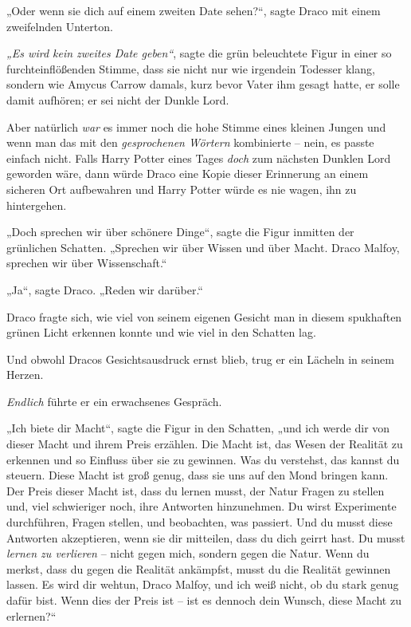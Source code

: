 {„Oder wenn sie dich auf einem zweiten Date sehen?“, sagte Draco mit einem zweifelnden Unterton.

\emph{„Es wird kein zweites Date geben“}, sagte die grün beleuchtete Figur in einer so furchteinflößenden Stimme, dass sie nicht nur wie irgendein Todesser klang, sondern wie Amycus Carrow damals, kurz bevor Vater ihm gesagt hatte, er solle damit aufhören; er sei nicht der Dunkle Lord.

Aber natürlich \emph{war} es immer noch die hohe Stimme eines kleinen Jungen und wenn man das mit den \emph{gesprochenen Wörtern} kombinierte -- nein, es passte einfach nicht. Falls Harry Potter eines Tages \emph{doch} zum nächsten Dunklen Lord geworden wäre, dann würde Draco eine Kopie dieser Erinnerung an einem sicheren Ort aufbewahren und Harry Potter würde es nie wagen, ihn zu hintergehen.

„Doch sprechen wir über schönere Dinge“, sagte die Figur inmitten der grünlichen Schatten. „Sprechen wir über Wissen und über Macht. Draco Malfoy, sprechen wir über Wissenschaft.“

„Ja“, sagte Draco. „Reden wir darüber.“

Draco fragte sich, wie viel von seinem eigenen Gesicht man in diesem spukhaften grünen Licht erkennen konnte und wie viel in den Schatten lag.

Und obwohl Dracos Gesichtsausdruck ernst blieb, trug er ein Lächeln in seinem Herzen.

\emph{Endlich} führte er ein erwachsenes Gespräch.

„Ich biete dir Macht“, sagte die Figur in den Schatten, „und ich werde dir von dieser Macht und ihrem Preis erzählen. Die Macht ist, das Wesen der Realität zu erkennen und so Einfluss über sie zu gewinnen. Was du verstehst, das kannst du steuern. Diese Macht ist groß genug, dass sie uns auf den Mond bringen kann. Der Preis dieser Macht ist, dass du lernen musst, der Natur Fragen zu stellen und, viel schwieriger noch, ihre Antworten hinzunehmen. Du wirst Experimente durchführen, Fragen stellen, und beobachten, was passiert. Und du musst diese Antworten akzeptieren, wenn sie dir mitteilen, dass du dich geirrt hast. Du musst \emph{lernen zu verlieren} -- nicht gegen mich, sondern gegen die Natur. Wenn du merkst, dass du gegen die Realität ankämpfst, musst du die Realität gewinnen lassen. Es wird dir wehtun, Draco Malfoy, und ich weiß nicht, ob du stark genug dafür bist. Wenn dies der Preis ist -- ist es dennoch dein Wunsch, diese Macht zu erlernen?“

}
